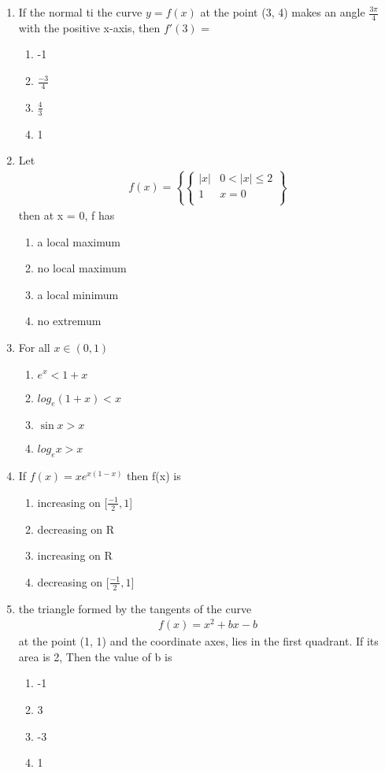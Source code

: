\begin{enumerate}[label=\arabic*.,ref=\thesubsection.\theenumi]
\item If the normal ti the curve $y = f(x)$ at the point (3, 4) makes an angle $\frac{3\pi}{4}$ with the positive 
x-axis, then $f'(3)$ =
\begin{enumerate}
\item -1
\item $\frac{-3}{4}$
\item $\frac{4}{3}$
\item 1
\end{enumerate}

\item Let
\begin{align*} 
f(x) =
\left\lbrace\begin{cases} 
      |x|  &  0 < |x| \leq 2 \\
      1  & x = 0  \\
\end{cases}\right\rbrace 
\end{align*}
then at x = 0, f has
\begin{enumerate}
\item a local maximum
\item no local maximum
\item a local minimum
\item no extremum
\end{enumerate}

\item For all $x \in (0, 1)$
\begin{enumerate}
\item $e^x < 1 + x$
\item $log_e(1 + x) < x$
\item $\sin x > x$
\item $log_ex > x$
\end{enumerate}

\item If $f(x) = xe^{x(1 - x)}$ then f(x) is
\begin{enumerate}
\item increasing on [$\frac{-1}{2}, 1$]
\item decreasing on R
\item increasing on R
\item decreasing on [$\frac{-1}{2}, 1$]
\end{enumerate}

\item the triangle formed by the tangents of the curve 
\begin{align*} 
f(x) = x^2 + bx - b
\end{align*}
at the point (1, 1) and the coordinate axes, lies in the first quadrant. If its area is 2, Then the value of b is
\begin{enumerate}
\item -1
\item 3
\item -3
\item 1
\end{enumerate}


\end{enumerate}
